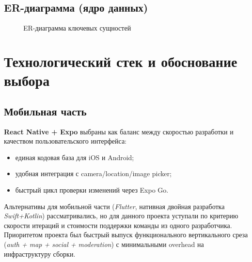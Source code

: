 \documentclass[12pt,a4paper]{article}
\begin{document}
\subsection{ER-диаграмма (ядро данных)}

\begin{figure}[H]
\centering
{}
\caption{ER-диаграмма ключевых сущностей}
\end{figure}


\section{Технологический стек и обоснование выбора}

\subsection{Мобильная часть}

\textbf{React Native + Expo} выбраны как баланс между скоростью разработки и качеством пользовательского интерфейса:
\begin{itemize}
  \item единая кодовая база для iOS и Android;
  \item удобная интеграция с camera/location/image picker;
  \item быстрый цикл проверки изменений через Expo Go.
\end{itemize}

Альтернативы для мобильной части (\textit{Flutter}, нативная двойная разработка \textit{Swift+Kotlin}) рассматривались, но для данного проекта уступали по критерию скорости итераций и стоимости поддержки команды из одного разработчика. Приоритетом проекта был быстрый выпуск функционального вертикального среза (\textit{auth + map + social + moderation}) с минимальными overhead на инфраструктуру сборки.
\end{document}
